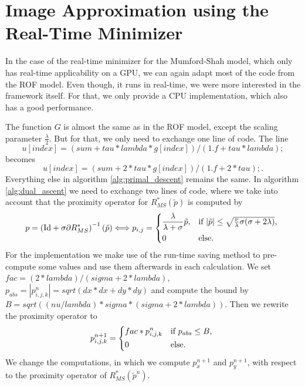 \documentclass{scrreprt}
\begin{document}
        

    \section{Image Approximation using the Real-Time Minimizer} %
    \label{sec:image_approximation_using_the_real_time_minimizer}
        
        In the case of the real-time minimizer for the Mumford-Shah model, which only has real-time applicability on a GPU, we can again adapt most of the code from the ROF model. Even though, it runs in real-time, we were more interested in the framework itself. For that, we only provide a CPU implementation, which also has a good performance.

        The function $G$ is almost the same as in the ROF model, except the scaling parameter $\frac{\lambda}{2}$. But for that, we only need to exchange one line of code. The line
            $$
                u[index] = (sum + tau * lambda * g[index]) / (1.f + tau * lambda);
            $$
        becomes
            $$
                u[index] = (sum + 2 * tau * g[index]) / (1.f + 2 * tau);.
            $$
        Everything else in algorithm \ref{alg:primal_descent} remains the same. In algorithm \ref{alg:dual_ascent} we need to exchange two lines of code, where we take into account that the proximity operator for $R_{MS}^{\ast}(\tilde{p})$ is computed by
            $$
                p = \left( \textnormal{Id} + \sigma \partial R_{MS}^{\ast} \right)^{-1}(\tilde{p}) \Longleftrightarrow p_{i,j} =
                    \begin{dcases*}
                        \frac{\lambda}{\lambda + \sigma} \tilde{p}, & \textnormal{if $|\tilde{p}| \le \sqrt{\frac{\nu}{\lambda}\sigma(\sigma + 2\lambda)}$,} \\
                        0 & \textnormal{else.}
                    \end{dcases*}
            $$
        For the implementation we make use of the run-time saving method to pre-compute some values and use them afterwards in each calculation. We set $fac = (2 * lambda) / (sigma + 2 * lambda)$, $p_{abs} = |p^{n}_{i,j,k}| = sqrt(dx*dx+dy*dy)$ and compute the bound by $B = sqrt((nu / lambda) * sigma * (sigma + 2 * lambda))$. Then we rewrite the proximity operator to
            $$
                p^{n+1}_{i,j,k} =
                    \begin{dcases*}
                        fac*p^{n}_{i,j,k} & \textnormal{if $p_{abs} \le B$,} \\
                        0 & \textnormal{else.}
                    \end{dcases*}
            $$
        We change the computations, in which we compute $p^{n+1}_{x}$ and $p^{n+1}_{y}$, with respect to the proximity operator of $R_{MS}^{\ast}(\tilde{p}^{n})$.
\end{document}
